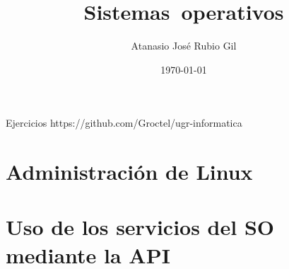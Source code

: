 \documentclass[10pt]{report}
\author{Atanasio José Rubio Gil}
\title{Sistemas\ operativos}
\date{\today}
\begin{document}
            {Ejercicios}
            {https://github.com/Groctel/ugr-informatica}
\tableofcontents

\chapter{Administración de Linux}
 \pagebreak
 \pagebreak
 \pagebreak


\chapter{Uso de los servicios del SO mediante la API}
 \pagebreak
 \pagebreak
 \pagebreak
 \pagebreak


\aqsec{\S}
\aqssec{}

 \pagebreak
   \pagebreak
    \pagebreak

\end{document}
